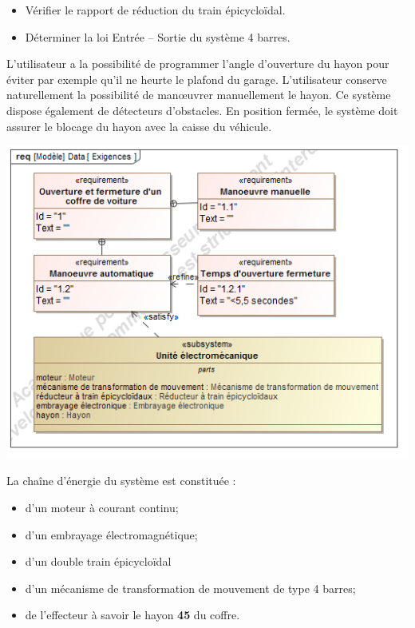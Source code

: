 \documentclass[10pt,fleqn]{article} %
\begin{document}
\begin{multicols}{2}
\begin{obj}
\begin{itemize}
\item Vérifier le rapport de réduction du train épicycloïdal.
\item Déterminer la loi Entrée -- Sortie du système 4 barres.
\end{itemize}
\end{obj}

L’utilisateur a la possibilité de programmer l’angle d’ouverture du hayon pour
éviter par exemple qu’il ne heurte le plafond du garage. L’utilisateur conserve
naturellement la possibilité de man\oe{}uvrer manuellement le hayon. Ce système
dispose également de détecteurs d’obstacles.
En position fermée, le système doit assurer le blocage du hayon avec la caisse
du véhicule.
\begin{center}
\includegraphics[width=.95\linewidth]{images/SysML/Req}
\end{center}



La chaîne d'énergie du système est constituée :
\begin{itemize}
\item d'un moteur à courant continu;
\item d'un embrayage électromagnétique;
\item d'un double train épicycloïdal
\item d'un mécanisme de transformation de mouvement de type 4 barres;
\item de l'effecteur à savoir le hayon \textbf{45} du coffre.
\end{itemize}


\end{multicols}
\end{document}
